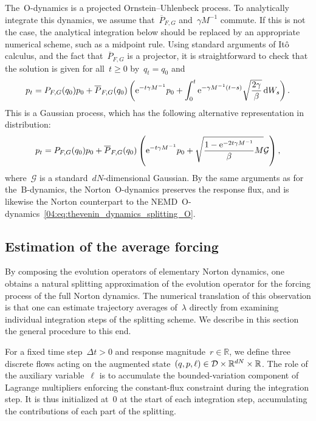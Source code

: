 The~$\mathrm{O}$-dynamics is a projected Ornstein--Uhlenbeck process. To analytically integrate this dynamics, we assume that~$\overline{P}_{F,G}$ and~$\gamma M^{-1}$ commute. If this is not the case, the analytical integration below should be replaced by an appropriate numerical scheme, such as a midpoint rule. Using standard arguments of It\^o calculus, and the fact that~$\overline{P}_{F,G}$ is a projector, it is straightforward to check that the solution is given for all~$t\geq 0$ by~$q_t=q_0$ and 
\[p_t = {P}_{F,G}(q_0)p_0 +\overline{P}_{F,G}(q_0)\left(\mathrm{e}^{-t\gamma M^{-1}}p_0 +\int_0^t \mathrm{e}^{-\gamma M^{-1}(t-s)}\sqrt{\frac{2\gamma}{\beta}}\,\mathrm{d} W_s\right).\]
This is a Gaussian process, which has the following alternative representation  in distribution:
\begin{equation}
\label{04:eq:norton_o_step_gaussian_distribution}
p_t = {P}_{F,G}(q_0)p_0 + \overline{P}_{F,G}(q_0)\left(\mathrm{e}^{-t\gamma M^{-1}}p_0 +\sqrt{\frac{1-\mathrm{e}^{-2t\gamma M^{-1}}}{\beta}M}\mathcal{G}\right),
\end{equation}
where~$\mathcal{G}$ is a standard~$dN$-dimensional Gaussian. By the same arguments as for the~$\mathrm{B}$-dynamics, the Norton~$\mathrm{O}$-dynamics preserves the response flux, and is likewise the Norton counterpart to the NEMD~$\mathrm{O}$-dynamics~\eqref{04:eq:thevenin_dynamics_splitting_O}.

\subsection{Estimation of the average forcing}\label{04:subsec:discr_lambda}
By composing the evolution operators of elementary Norton dynamics, one obtains a natural splitting approximation of the evolution operator for the forcing process of the full Norton dynamics. The numerical translation of this observation is that one can estimate trajectory averages of~$\lambda$ directly from examining individual integration steps of the splitting scheme. We describe in this section the general procedure to this end.

For a fixed time step~$\Delta t>0$ and response magnitude~$r\in\mathbb R$, we define three discrete flows acting on the augmented state~$(q,p,\ell)\in \mathcal D \times \mathbb{R}^{dN}\times \mathbb{R}$. The role of the auxiliary variable~$\ell$ is to accumulate the bounded-variation component of Lagrange multipliers enforcing the constant-flux constraint during the integration step. It is thus initialized at~$0$ at the start of each integration step, accumulating the contributions of each part of the splitting.

